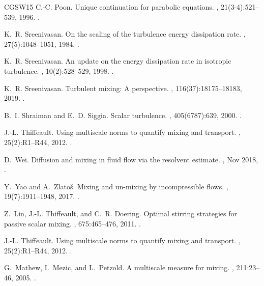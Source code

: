 \documentclass[12pt]{report}   %
\numberwithin{equation}{section}
\theoremstyle{plain}
\theoremstyle{definition}
\theoremstyle{remark}
\begin{document}
\begin{thebibliography}{CGSW15}
C.-C. Poon.
\newblock Unique continuation for parabolic equations.
, 21(3-4):521--539, 1996.
\newblock {}.

K.~R. Sreenivasan.
\newblock On the scaling of the turbulence energy dissipation rate.
, 27(5):1048--1051, 1984.
\newblock {}.

K.~R. Sreenivasan.
\newblock An update on the energy dissipation rate in isotropic turbulence.
, 10(2):528--529, 1998.
\newblock {}.

K.~R. Sreenivasan.
\newblock Turbulent mixing: A perspective.
,
  116(37):18175--18183, 2019.
\newblock {}.

B.~I. Shraiman and E.~D. Siggia.
\newblock Scalar turbulence.
, 405(6787):639, 2000.
\newblock {}.

J.-L. Thiffeault.
\newblock Using multiscale norms to quantify mixing and transport.
, 25(2):R1--R44, 2012.
\newblock {}.

D.~Wei.
\newblock Diffusion and mixing in fluid flow via the resolvent estimate.
, Nov 2018,
  .

Y.~Yao and A.~Zlato\v{s}.
\newblock Mixing and un-mixing by incompressible flows.
, 19(7):1911--1948, 2017.
\newblock {}.

Z.~Lin, J.-L. Thiffeault, and C.~R. Doering.
\newblock Optimal stirring strategies for passive scalar mixing.
, 675:465--476, 2011.
\newblock {}.

J.-L. Thiffeault.
\newblock Using multiscale norms to quantify mixing and transport.
, 25(2):R1--R44, 2012.
\newblock {}.

G.~Mathew, I.~Mezic, and L.~Petzold.
\newblock A multiscale measure for mixing.
, 211:23--46, 2005.
\newblock {}.

\end{thebibliography}
\end{document}
